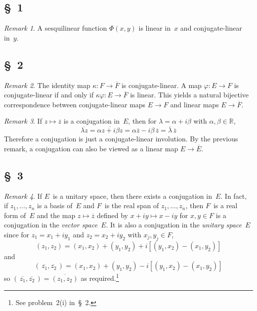 \documentclass[letterpaper,12pt]{article}
\newcommand{\R}{\mathbb{R}}
\newcommand{\iprod}[2]{(#1,#2)}
\newcommand{\conj}[1]{\overline{#1}}
\theoremstyle{definition}
\theoremstyle{remark}
\newtheorem*{rmk}{Remark}
\begin{document}
\subsection*{\S~1}
\begin{rmk}
A sesquilinear function \(\Phi(x,y)\) is linear in~\(x\) and conjugate-linear in~\(y\).
\end{rmk}

\subsection*{\S~2}
\begin{rmk}
The identity map \(\kappa:F\to\conj{F}\) is conjugate-linear. A map \(\varphi:E\to F\) is conjugate-linear if and only if \(\kappa\varphi:E\to\conj{F}\) is linear. This yields a natural bijective correspondence between conjugate-linear maps \(E\to F\) and linear maps \(E\to\conj{F}\).
\end{rmk}

\begin{rmk}
If \(z\mapsto\conj{z}\) is a conjugation in~\(E\), then for \(\lambda=\alpha+i\beta\) with \(\alpha,\beta\in\R\),
\[\conj{\lambda z}=\conj{\alpha z+i\beta z}=\alpha\conj{z}-i\beta\,\conj{z}=\conj{\lambda}\,\conj{z}\]
Therefore a conjugation is just a conjugate-linear involution. By the previous remark, a conjugation can also be viewed as a linear map \(E\to\conj{E}\).
\end{rmk}

\subsection*{\S~3}
\begin{rmk}
If \(E\)~is a unitary space, then there exists a conjugation in~\(E\). In fact, if \(z_1,\ldots,z_n\) is a basis of~\(E\) and \(F\)~is the real span of \(z_1,\ldots,z_n\), then \(F\)~is a real form of~\(E\) and the map \(z\mapsto\conj{z}\) defined by \(x+iy\mapsto x-iy\) for \(x,y\in F\) is a conjugation in the \emph{vector space}~\(E\). It is also a conjugation in the \emph{unitary space}~\(E\) since for \(z_1=x_1+iy_1\) and \(z_2=x_2+iy_2\) with \(x_j,y_j\in F\),
\[\iprod{z_1}{z_2}=\iprod{x_1}{x_2}+\iprod{y_1}{y_2}+i\left[\iprod{y_1}{x_2}-\iprod{x_1}{y_2}\right]\]
and
\[\iprod{\,\conj{z_1}}{\conj{z_2}\,}=\iprod{x_1}{x_2}+\iprod{y_1}{y_2}-i\left[\iprod{y_1}{x_2}-\iprod{x_1}{y_2}\right]\]
so \(\iprod{\,\conj{z_1}}{\conj{z_2}\,}=\conj{\iprod{z_1}{z_2}}\) as required.\footnote{See problem~2(i) in~\S~2.}
\end{rmk}
\end{document}
